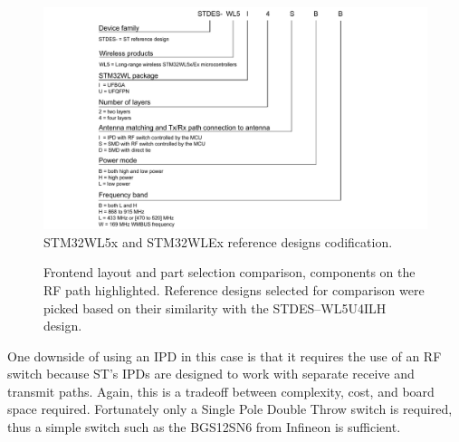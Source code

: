 \begin{figure}
    \includegraphics[width=\textwidth]{fig/STDES-xxxxxxx.png}
    \caption{\label{fig:reference-design-codification}STM32WL5x and STM32WLEx reference designs codification.}
\end{figure}

\begin{figure}
    \centering
    \hfil
    \hfil
    \caption{\label{fig:frontend-comparison}Frontend layout and part selection comparison, components on the RF path highlighted. Reference designs selected for comparison were picked based on their similarity with the STDES--WL5U4ILH design.}
\end{figure}

One downside of using an IPD in this case is that it requires the use of an RF switch because ST's IPDs are designed to work with separate receive and transmit paths. Again, this is a tradeoff between complexity, cost, and board space required. Fortunately only a Single Pole Double Throw switch is required, thus a simple switch such as the BGS12SN6 from Infineon \cite{infineon_technologies_bgs12sn6_2024} is sufficient.

